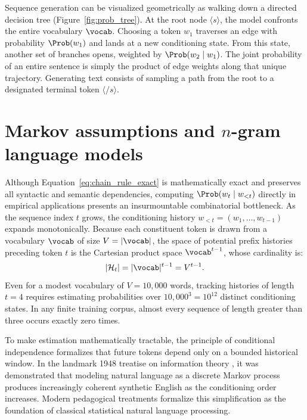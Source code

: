 \documentclass[../../main.tex]{subfiles}
\begin{document}
\begin{intuition}
Sequence generation can be visualized geometrically as walking down a directed decision tree (Figure~\ref{fig:prob_tree}). At the root node $\langle s \rangle$, the model confronts the entire vocabulary $\vocab$. Choosing a token $w_1$ traverses an edge with probability $\Prob(w_1)$ and lands at a new conditioning state. From this state, another set of branches opens, weighted by $\Prob(w_2 \mid w_1)$. The joint probability of an entire sentence is simply the product of edge weights along that unique trajectory. Generating text consists of sampling a path from the root to a designated terminal token $\langle /s \rangle$.
\end{intuition}

\section{Markov assumptions and $n$-gram language models}
\label{sec:markov_ngram}

Although Equation~\eqref{eq:chain_rule_exact} is mathematically exact and preserves all syntactic and semantic dependencies, computing $\Prob(w_t \mid w_{<t})$ directly in empirical applications presents an insurmountable combinatorial bottleneck. As the sequence index $t$ grows, the conditioning history $w_{<t} = (w_1, \dots, w_{t-1})$ expands monotonically. Because each constituent token is drawn from a vocabulary $\vocab$ of size $V = |\vocab|$, the space of potential prefix histories preceding token $t$ is the Cartesian product space $\vocab^{t-1}$, whose cardinality is:
\begin{equation}
\label{eq:state_space_unconstrained}
|\mathcal{H}_t| = |\vocab|^{t-1} = V^{t-1}.
\end{equation}
Even for a modest vocabulary of $V = 10{,}000$ words, tracking histories of length $t = 4$ requires estimating probabilities over $10{,}000^3 = 10^{12}$ distinct conditioning states. In any finite training corpus, almost every sequence of length greater than three occurs exactly zero times.

To make estimation mathematically tractable, the principle of conditional independence formalizes that future tokens depend only on a bounded historical window. In the landmark 1948 treatise on information theory \cite{shannon1948}, it was demonstrated that modeling natural language as a discrete Markov process produces increasingly coherent synthetic English as the conditioning order increases. Modern pedagogical treatments \cite{jurafsky2024} formalize this simplification as the foundation of classical statistical natural language processing.
\end{document}

